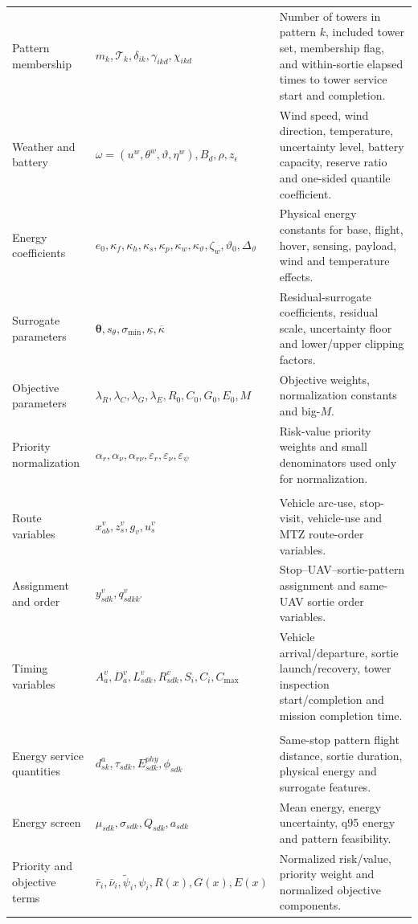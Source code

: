 \begin{table}[t]
\begin{tabularx}{\textwidth}{@{}p{}p{}X@{}}
Pattern membership & \(m_k,\mathcal{T}_k,\delta_{ik},\gamma_{ikd},\chi_{ikd}\) & Number of towers in pattern \(k\), included tower set, membership flag, and within-sortie elapsed times to tower service start and completion. \\
Weather and battery & \(\omega=(u^w,\theta^w,\vartheta,\eta^w),B_d,\rho,z_\epsilon\) & Wind speed, wind direction, temperature, uncertainty level, battery capacity, reserve ratio and one-sided quantile coefficient. \\
Energy coefficients & \(e_0,\kappa_f,\kappa_h,\kappa_s,\kappa_p,\kappa_w,\kappa_\vartheta,\zeta_w,\vartheta_0,\Delta_\vartheta\) & Physical energy constants for base, flight, hover, sensing, payload, wind and temperature effects. \\
Surrogate parameters & \(\boldsymbol\theta,s_\theta,\sigma_{\min},\underline\kappa,\overline\kappa\) & Residual-surrogate coefficients, residual scale, uncertainty floor and lower/upper clipping factors. \\
Objective parameters & \(\lambda_R,\lambda_C,\lambda_G,\lambda_E,R_0,C_0,G_0,E_0,M\) & Objective weights, normalization constants and big-\(M\). \\
Priority normalization & \(\alpha_r,\alpha_\nu,\alpha_{r\nu},\varepsilon_r,\varepsilon_\nu,\varepsilon_\psi\) & Risk-value priority weights and small denominators used only for normalization. \\
\addlinespace[2pt]
\multicolumn{3}{@{}l}{\textit{Decision variables}}\\
Route variables & \(x^v_{ab},z^v_s,g_v,u^v_s\) & Vehicle arc-use, stop-visit, vehicle-use and MTZ route-order variables. \\
Assignment and order & \(y^v_{sdk},q^v_{sdkk'}\) & Stop--UAV--sortie-pattern assignment and same-UAV sortie order variables. \\
Timing variables & \(A^v_a,D^v_a,L^v_{sdk},R^v_{sdk},S_i,C_i,C_{\max}\) & Vehicle arrival/departure, sortie launch/recovery, tower inspection start/completion and mission completion time. \\
\addlinespace[2pt]
\multicolumn{3}{@{}l}{\textit{Auxiliary quantities}}\\
Energy service quantities & \(d^a_{sk},\tau_{sdk},E^{phy}_{sdk},\phi_{sdk}\) & Same-stop pattern flight distance, sortie duration, physical energy and surrogate features. \\
Energy screen & \(\mu_{sdk},\sigma_{sdk},Q_{sdk},a_{sdk}\) & Mean energy, energy uncertainty, q95 energy and pattern feasibility. \\
Priority and objective terms & \(\bar r_i,\bar\nu_i,\tilde\psi_i,\psi_i,R(x),G(x),E(x)\) & Normalized risk/value, priority weight and normalized objective components. \\
\bottomrule
\end{tabularx}
\end{table}

